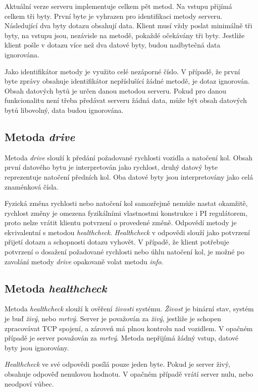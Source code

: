 \documentclass[czech, bachelor]{diploma}
\begin{document}
Aktuální verze serveru implementuje celkem pět metod. Na vstupu přijímá celkem tři byty. První byte je vyhrazen pro identifikaci
metody serveru. Následující dva byty dotazu obsahují data. Klient musí vždy poslat minimálně tři byty, na vstupu jsou, nezávisle
na metodě, pokaždé očekávány tři byty. Jestliže klient pošle v dotazu více než dva datové byty, budou nadbytečná data ignorována.

Jako identifikátor metody je využito celé nezáporné číslo. V případě, že první byte zprávy obsahuje identifikátor nepříslušící
žádné metodě, je dotaz ignorován. Obsah datových bytů je určen danou metodou serveru. Pokud pro danou funkcionalitu není třeba
předávat serveru žádná data, může být obsah datových bytů libovolný, data budou ignorována.

\subsection{Metoda \emph{drive}}
Metoda \emph{drive} slouží k předání požadované rychlosti vozidla a natočení kol. Obsah první datového bytu je interpretován jako
rychlost, druhý datový byte reprezentuje natočení předních kol. Oba datové byty jsou interpretovány jako celá znaménková čísla.

Fyzická změna rychlosti nebo natočení kol samozřejmě nemůže nastat okamžitě, rychlost změny je omezena fyzikálními vlastnostmi
konstrukce i PI regulátorem, proto nelze vrátit klientu potvrzení o provedené změně. Odpovědí metody je ekvivalentní s metodou
\emph{healthcheck}. \emph{Healthcheck} v odpovědi slouží jako potvrzení přijetí dotazu a schopnosti dotazu vyhovět. V případě,
že klient potřebuje potvrzení o dosažení požadované rychlosti nebo úhlu natočení kol, je možné po zavolání metody \emph{drive}
opakovaně volat metodu \emph{info}.

\subsection{Metoda \emph{healthcheck}}
Metoda \emph{healthcheck} slouží k ověření \emph{živosti} systému. \emph{Živost} je binární stav, systém je buď \emph{živý}, nebo
\emph{mrtvý}. Server je považován za \emph{živý}, jestliže je schopen zpracovávat TCP spojení, a zároveň má plnou kontrolu
nad vozidlem. V opačném případě je server považován za \emph{mrtvý}. Metoda nepřijímá žádný vstup, datové byty jsou ignorovány.

\emph{Healthcheck} ve své odpovědi posílá pouze jeden byte. Pokud je server živý, obsahuje odpověď nenulovou hodnotu. V opačném
případě vrátí server nulu, nebo neodpoví vůbec.
\end{document}
